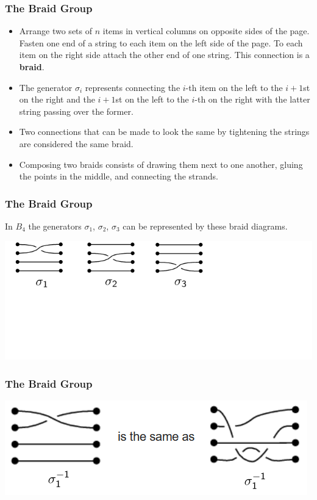 \documentclass{beamer}
\begin{document}
\begin{frame}
	\frametitle{The Braid Group}
	\begin{itemize}
	\item Arrange two sets of $n$ items in vertical columns on opposite sides of the page. Fasten one end of a string to each item on the left side of the page. To each item on the right side attach the other end of one string. This connection is a \textbf{braid}.\pause

	\item The generator $\sigma_i$ represents connecting the $i$-th item on the left to the $i+1$st on the right and the $i+1$st on the left to the $i$-th on the right with the latter string passing over the former.\pause

	\item Two connections that can be made to look the same by tightening the strings are considered the same braid.\pause

	\item Composing two braids consists of drawing them next to one another, gluing the points in the middle, and connecting the strands.
	\end{itemize}
\end{frame}

\begin{frame}
	\frametitle{The Braid Group}
	\begin{example}
		In $B_4$ the generators $\sigma_1$, $\sigma_2$, $\sigma_3$ can be represented by these braid diagrams.
	\end{example}\pause
	\vfill
	\centering
	\includegraphics[scale=.7]{b4gens.png}
\end{frame}

\begin{frame}
	\frametitle{The Braid Group}
	\centering
	\includegraphics[scale=.6]{same.PNG}
\end{frame}
\end{document}
